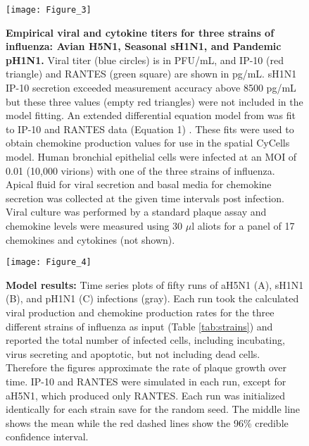 \documentclass[preprint,10pt,numbers]{elsarticle}
\begin{document}
\begin{figure}[!ht]
\begin{center}
 \texttt{[image: Figure\_3]}
 \end{center}
\caption{{\bf Empirical viral and cytokine titers for three strains of influenza: Avian H5N1, Seasonal sH1N1, and Pandemic pH1N1.}  Viral titer (blue circles) is in PFU/mL, and IP-10 (red triangle) and RANTES (green square) are shown in pg/mL.   sH1N1 IP-10 secretion exceeded measurement accuracy above 8500 pg/mL but these three values (empty red triangles) were not included in the model fitting.  An extended differential equation model from \citep{Mitchell2011} was fit to IP-10 and RANTES data (Equation 1) .  These fits were used to obtain chemokine production values for use in the spatial CyCells model.  Human bronchial epithelial cells were infected at an MOI of 0.01 (10,000 virions) with one of the three strains of influenza.  Apical fluid for viral secretion and basal media for chemokine secretion was collected at the given time intervals post infection.  Viral culture was performed by a standard plaque assay and chemokine levels were measured using 30 $\mu$l aliots for a panel of 17 chemokines and cytokines (not shown).} 
 \label{fig:data}
\end{figure}

\begin{figure}[ht!]
\begin{center}
\texttt{[image: Figure\_4]}
 \end{center}
\caption{\textbf{Model results:} Time series plots of fifty runs of aH5N1 (A), sH1N1 (B), and pH1N1 (C) infections (gray). Each run took the calculated viral production and chemokine production rates for the three different strains of influenza as input (Table \ref{tab:strains}) and reported the total number of infected cells, including incubating, virus secreting and apoptotic, but not including dead cells.  Therefore the figures approximate the rate of plaque growth over time.  IP-10 and RANTES were simulated in each run, except for aH5N1, which  produced only RANTES.  Each run was initialized identically for each strain save for the random seed.  The middle line shows the mean while the red dashed lines show the 96\% credible confidence interval.} 
 \label{fig:variance}
\end{figure}
\end{document}
